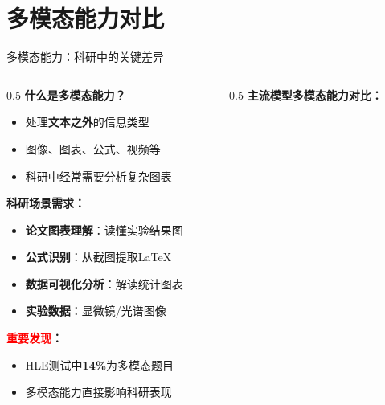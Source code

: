 \documentclass[aspectratio=169,11pt]{beamer}
\begin{document}
\section{多模态能力对比}

\begin{frame}{多模态能力：科研中的关键差异}
    \begin{columns}
        \begin{column}{0.5\textwidth}
            \textbf{什么是多模态能力？}
            \begin{itemize}
                \item 处理\textbf{文本之外}的信息类型
                \item 图像、图表、公式、视频等
                \item 科研中经常需要分析复杂图表
            \end{itemize}
            
            \vspace{0.3cm}
            \textbf{科研场景需求：}
            \begin{itemize}
                \item \textbf{论文图表理解}：读懂实验结果图
                \item \textbf{公式识别}：从截图提取LaTeX
                \item \textbf{数据可视化分析}：解读统计图表
                \item \textbf{实验数据}：显微镜/光谱图像
            \end{itemize}
            
            \vspace{0.3cm}
            \textbf{\textcolor{red}{重要发现}：}
            \begin{itemize}
                \item HLE测试中\textbf{14\%}为多模态题目
                \item 多模态能力直接影响科研表现
            \end{itemize}
        \end{column}
        \begin{column}{0.5\textwidth}
            \textbf{主流模型多模态能力对比：}
            

\end{column}
\end{columns}
\end{frame}
\end{document}
